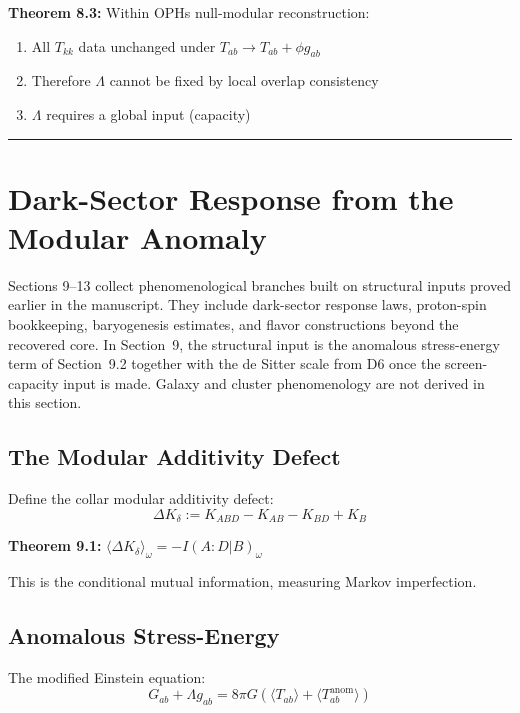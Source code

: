 \textbf{Theorem 8.3:} Within OPH\textquotesingle s null-modular reconstruction:

\begin{enumerate}
\def\labelenumi{\arabic{enumi}.}
\tightlist
\item
 All \(T_{kk}\) data unchanged under \(T_{ab} \to T_{ab} + \phi g_{ab}\)
\item
 Therefore \(\Lambda\) cannot be fixed by local overlap consistency
\item
 \(\Lambda\) requires a global input (capacity)
\end{enumerate}

\begin{center}\rule{0.5\linewidth}{0.5pt}\end{center}

\section{Dark-Sector Response from the Modular Anomaly}\label{9-dark-matter-as-modular-anomaly}

Sections 9--13 collect phenomenological branches built on structural inputs proved earlier in the manuscript. They include dark-sector response laws, proton-spin bookkeeping, baryogenesis estimates, and flavor constructions beyond the recovered core. In Section~9, the structural input is the anomalous stress-energy term of Section~9.2 together with the de Sitter scale from D6 once the screen-capacity input is made. Galaxy and cluster phenomenology are not derived in this section.

\subsection{The Modular Additivity Defect}\label{91-the-modular-additivity-defect}

Define the collar modular additivity defect: \[\Delta K_\delta := K_{ABD} - K_{AB} - K_{BD} + K_B\]

\textbf{Theorem 9.1:} \(\langle \Delta K_\delta \rangle_\omega = -I(A:D|B)_\omega\)

This is the conditional mutual information, measuring Markov imperfection.

\subsection{Anomalous Stress-Energy}\label{92-anomalous-stress-energy}

The modified Einstein equation: \[G_{ab} + \Lambda g_{ab} = 8\pi G \left(\langle T_{ab} \rangle + \langle T_{ab}^{\text{anom}} \rangle\right)\]

